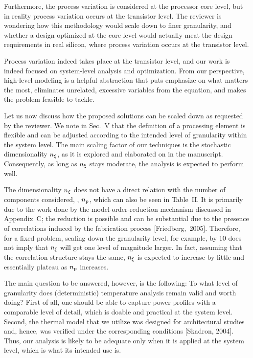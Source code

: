 \begin{reviewer}
Furthermore, the process variation is considered at the processor core level,
but in reality process variation occurs at the transistor level. The reviewer
is wondering how this methodology would scale down to finer granularity, and
whether a design optimized at the core level would actually meat the design
requirements in real silicon, where process variation occurs at the transistor
level.
\end{reviewer}

\begin{authors}
Process variation indeed takes place at the transistor level, and our work is
indeed focused on system-level analysis and optimization. From our perspective,
high-level modeling is a helpful abstraction that puts emphasize on what matters
the most, eliminates unrelated, excessive variables from the equation, and makes
the problem feasible to tackle.

Let us now discuss how the proposed solutions can be scaled down as requested by
the reviewer. We note in Sec.~V that the definition of a processing element is
flexible and can be adjusted according to the intended level of granularity
within the system level. The main scaling factor of our techniques is the
stochastic dimensionality ${n_\xi}$, as it is explored and elaborated on in the
manuscript. Consequently, as long as ${n_\xi}$ stays moderate, the analysis is
expected to perform well.

The dimensionality ${n_\xi}$ does not have a direct relation with the number of
components considered, \ie, ${n_\text{p}}$, which can also be seen in Table~II. It
is primarily due to the work done by the model-order-reduction mechanism
discussed in Appendix~C; the reduction is possible and can be substantial due
to the presence of correlations induced by the fabrication process
[Friedberg,~2005]. Therefore, for a fixed problem, scaling down the granularity
level, for example, by 10 does not imply that ${n_\xi}$ will get one level of
magnitude larger. In fact, assuming that the correlation structure stays the
same, ${n_\xi}$ is expected to increase by little and essentially plateau as
${n_\text{p}}$ increases.

The main question to be answered, however, is the following: To what level of
granularity does (deterministic) temperature analysis remain valid and worth
doing? First of all, one should be able to capture power profiles with a
comparable level of detail, which is doable and practical at the system level.
Second, the thermal model that we utilize was designed for architectural
studies and, hence, was verified under the corresponding conditions [Skadron,
2004]. Thus, our analysis is likely to be adequate only when it is applied at
the system level, which is what its intended use is.


\end{authors}
